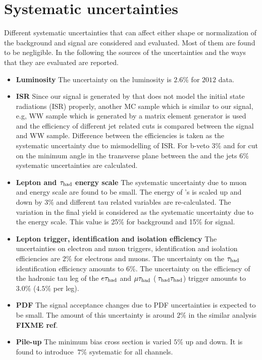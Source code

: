 \section{Systematic uncertainties}
\label{sect:sys}
Different systematic uncertainties that can affect either shape or normalization of the background and  signal are considered and evaluated.
Most of them are found to be negligible. In the following the sources of the uncertainties and the ways that they are evaluated are reported.
\begin {itemize}
\item{{\bf Luminosity}} The uncertainty on the luminosity  is $2.6\%$ for $2012$ data.
\item{\bf ISR}
Since our signal is generated by \PYTHIA that does not  model the initial state radiations (ISR) properly, another MC sample which is similar to our signal, e.g, WW sample 
which is generated by a matrix element generator is used and the efficiency of different jet related cuts is compared between the signal and WW sample. Difference between the
efficiencies is taken as the systematic uncertainty due to mismodelling of ISR. For b-veto 3\% and for cut on   the minimum angle in the transverse plane between 
the \MET and the jets 6\% systematic uncertainties are  calculated.  
\item{\bf Lepton and $\tau_{\rm had}$ energy scale}
The systematic uncertainty due to muon and  energy scale are found to be small.
The energy of \hadtau's is scaled up and down by $3\%$ and different tau related variables are re-calculated.  The variation in the final yield is considered as the
systematic uncertainty due to the \Tau energy scale. This value is 25\% for background and 15\% for signal.
\item{\bf Lepton trigger, identification and isolation efficiency}
The uncertainties on electron and muon triggers, identification and isolation efficiencies are $2\%$ for electrons and muons. 
The uncertainty on the $\tau_{\rm had}$ identification efficiency amounts to $6\%$. 
The uncertainty on the efficiency of the hadronic tau leg of the $e\tau_{\rm had}$ and $\mu\tau_{\rm had}$ ($\,\tau_{\rm had}\tau_{\rm had}$) trigger amounts to $3.0\%$ ($4.5\%$ per leg).
\item{\bf PDF}
The signal acceptance changes due to PDF uncertainties is expected to be small. 
The amount of this uncertainty is around $2\%$ in the similar analysis {\bf FIXME  ref}.
\item{\bf Pile-up}
The minimum bias cross section is varied $5 \%$ up and down. It is found to introduce $~7 \%$ systematic for all channels.    
\end{itemize}


